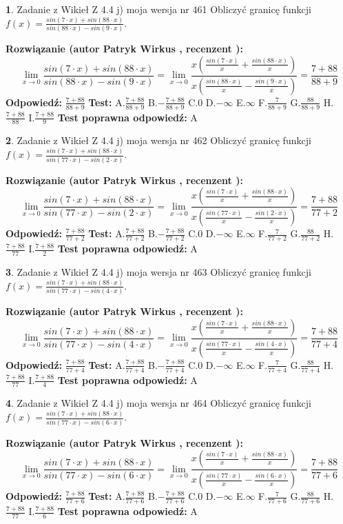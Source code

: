 \documentclass[12pt, a4paper]{article}
\theoremstyle{definition} %
\newtheorem{zad}{}
\newcommand{\zadStart}[1]{\begin{zad}#1\newline}
\newcommand{\zadStop}{\end{zad}}
\newcommand{\rozwStart}[2]{\noindent \textbf{Rozwiązanie (autor #1 , recenzent #2): }\newline}
\newcommand{\rozwStop}{\newline}
\newcommand{\odpStart}{\noindent \textbf{Odpowiedź:}\newline}
\newcommand{\odpStop}{\newline}
\newcommand{\testStart}{\noindent \textbf{Test:}\newline}
\newcommand{\testStop}{\newline}
\newcommand{\kluczStart}{\noindent \textbf{Test poprawna odpowiedź:}\newline}
\newcommand{\kluczStop}{\newline}
\begin{document}
\zadStart{Zadanie z Wikieł Z 4.4 j) moja wersja nr 461}
Obliczyć granicę funkcji $f(x)=\frac{sin(7\cdot x) +sin(88\cdot x)}{sin(88\cdot x) -sin(9\cdot x)}$.
\zadStop
\rozwStart{Patryk Wirkus}{}
$$\lim\limits_{x\to 0}\frac{sin(7\cdot x) +sin(88\cdot x)}{sin(88\cdot x) -sin(9\cdot x)}=\lim\limits_{x\to 0}\frac{x(\frac{sin(7\cdot x)}{x}+\frac{sin(88\cdot x)}{x})}{x(\frac{sin(88\cdot x)}{x}-\frac{sin(9\cdot x)}{x})}=\frac{7+88}{88+9}$$
\rozwStop
\odpStart
$\frac{7+88}{88+9}$
\odpStop
\testStart
A.$\frac{7+88}{88+9}$
B.$-\frac{7+88}{88+9}$
C.$0$
D.$-\infty$
E.$\infty$
F.$\frac{7}{88+9}$
G.$\frac{88}{88+9}$
H.$\frac{7+88}{88}$
I.$\frac{7+88}{9}$
\testStop
\kluczStart
A
\kluczStop



\zadStart{Zadanie z Wikieł Z 4.4 j) moja wersja nr 462}
Obliczyć granicę funkcji $f(x)=\frac{sin(7\cdot x) +sin(88\cdot x)}{sin(77\cdot x) -sin(2\cdot x)}$.
\zadStop
\rozwStart{Patryk Wirkus}{}
$$\lim\limits_{x\to 0}\frac{sin(7\cdot x) +sin(88\cdot x)}{sin(77\cdot x) -sin(2\cdot x)}=\lim\limits_{x\to 0}\frac{x(\frac{sin(7\cdot x)}{x}+\frac{sin(88\cdot x)}{x})}{x(\frac{sin(77\cdot x)}{x}-\frac{sin(2\cdot x)}{x})}=\frac{7+88}{77+2}$$
\rozwStop
\odpStart
$\frac{7+88}{77+2}$
\odpStop
\testStart
A.$\frac{7+88}{77+2}$
B.$-\frac{7+88}{77+2}$
C.$0$
D.$-\infty$
E.$\infty$
F.$\frac{7}{77+2}$
G.$\frac{88}{77+2}$
H.$\frac{7+88}{77}$
I.$\frac{7+88}{2}$
\testStop
\kluczStart
A
\kluczStop



\zadStart{Zadanie z Wikieł Z 4.4 j) moja wersja nr 463}
Obliczyć granicę funkcji $f(x)=\frac{sin(7\cdot x) +sin(88\cdot x)}{sin(77\cdot x) -sin(4\cdot x)}$.
\zadStop
\rozwStart{Patryk Wirkus}{}
$$\lim\limits_{x\to 0}\frac{sin(7\cdot x) +sin(88\cdot x)}{sin(77\cdot x) -sin(4\cdot x)}=\lim\limits_{x\to 0}\frac{x(\frac{sin(7\cdot x)}{x}+\frac{sin(88\cdot x)}{x})}{x(\frac{sin(77\cdot x)}{x}-\frac{sin(4\cdot x)}{x})}=\frac{7+88}{77+4}$$
\rozwStop
\odpStart
$\frac{7+88}{77+4}$
\odpStop
\testStart
A.$\frac{7+88}{77+4}$
B.$-\frac{7+88}{77+4}$
C.$0$
D.$-\infty$
E.$\infty$
F.$\frac{7}{77+4}$
G.$\frac{88}{77+4}$
H.$\frac{7+88}{77}$
I.$\frac{7+88}{4}$
\testStop
\kluczStart
A
\kluczStop



\zadStart{Zadanie z Wikieł Z 4.4 j) moja wersja nr 464}
Obliczyć granicę funkcji $f(x)=\frac{sin(7\cdot x) +sin(88\cdot x)}{sin(77\cdot x) -sin(6\cdot x)}$.
\zadStop
\rozwStart{Patryk Wirkus}{}
$$\lim\limits_{x\to 0}\frac{sin(7\cdot x) +sin(88\cdot x)}{sin(77\cdot x) -sin(6\cdot x)}=\lim\limits_{x\to 0}\frac{x(\frac{sin(7\cdot x)}{x}+\frac{sin(88\cdot x)}{x})}{x(\frac{sin(77\cdot x)}{x}-\frac{sin(6\cdot x)}{x})}=\frac{7+88}{77+6}$$
\rozwStop
\odpStart
$\frac{7+88}{77+6}$
\odpStop
\testStart
A.$\frac{7+88}{77+6}$
B.$-\frac{7+88}{77+6}$
C.$0$
D.$-\infty$
E.$\infty$
F.$\frac{7}{77+6}$
G.$\frac{88}{77+6}$
H.$\frac{7+88}{77}$
I.$\frac{7+88}{6}$
\testStop
\kluczStart
A
\kluczStop
\end{document}
